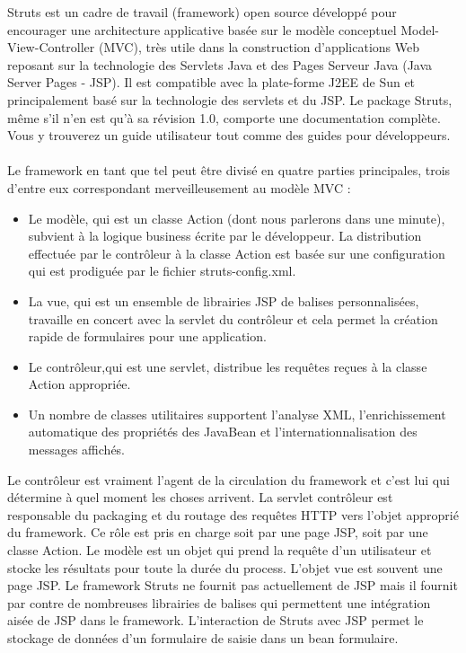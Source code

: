 Struts est un cadre de travail (framework) open source d{\'e}velopp{\'e} pour encourager une architecture applicative bas{\'e}e sur le mod{\`e}le conceptuel Model-View-Controller (MVC), tr{\`e}s utile dans la construction d'applications Web reposant sur la technologie des Servlets Java et des Pages Serveur Java (Java Server Pages - JSP). Il est compatible avec la plate-forme J2EE de Sun et principalement bas{\'e} sur la technologie des servlets et du JSP. Le package Struts, m{\^e}me s'il n'en est qu'{\`a} sa r{\'e}vision 1.0, comporte une documentation compl{\`e}te. Vous y trouverez un guide utilisateur tout comme des guides pour d{\'e}veloppeurs. \\\\
Le framework en tant que tel peut {\^e}tre divis{\'e} en quatre parties
principales, trois d'entre eux correspondant merveilleusement au
mod{\`e}le MVC :
\begin{itemize}
    \item Le mod{\`e}le, qui est un classe Action (dont nous parlerons dans une minute), subvient {\`a} la logique business {\'e}crite par le d{\'e}veloppeur. La distribution effectu{\'e}e par le contr{\^o}leur {\`a} la classe Action est bas{\'e}e sur une configuration qui est prodigu{\'e}e par le fichier struts-config.xml.
    \item La vue, qui est un ensemble de librairies JSP de balises personnalis{\'e}es, travaille en concert avec la servlet du contr{\^o}leur et cela permet la cr{\'e}ation rapide de formulaires pour une application.
    \item Le contr{\^o}leur,qui est une servlet, distribue les requ{\^e}tes re{\c c}ues {\`a} la classe Action appropri{\'e}e.
    \item Un nombre de classes utilitaires supportent l'analyse XML, l'enrichissement automatique des propri{\'e}t{\'e}s des JavaBean et l'internationnalisation des messages affich{\'e}s.\\
\end{itemize}

Le contr{\^o}leur est vraiment l'agent de la circulation du framework et c'est lui qui d{\'e}termine {\`a} quel moment les choses arrivent. La servlet contr{\^o}leur est responsable du packaging et du routage des requ{\^e}tes HTTP vers l'objet appropri{\'e} du framework. Ce r{\^o}le est pris en charge soit par une page JSP, soit par une classe Action.
Le mod{\`e}le est un objet qui prend la requ{\^e}te d'un utilisateur et stocke les r{\'e}sultats pour toute la dur{\'e}e du process.
L'objet vue est souvent une page JSP. Le framework Struts ne fournit pas actuellement de JSP mais il fournit par contre de nombreuses librairies de balises qui permettent une int{\'e}gration ais{\'e}e de JSP dans le framework. L'interaction de Struts avec JSP permet le stockage de donn{\'e}es d'un formulaire de saisie dans un bean formulaire.\\
 
